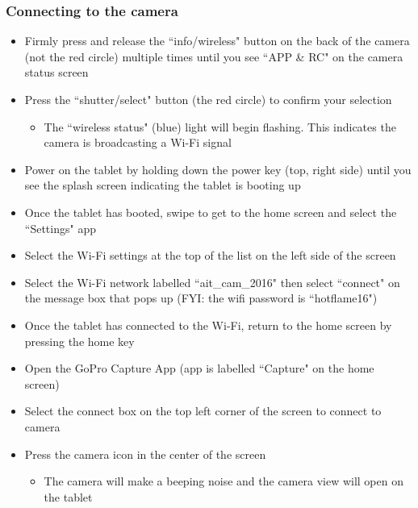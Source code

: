 \documentclass[letterpaper,11pt]{article}
\begin{document}
       
    \subsubsection{Connecting to the camera} 
        \begin{itemize}
        \item Firmly press and release the ``info/wireless" button on the back of
			the camera (not the red circle) multiple times until you see ``APP \& RC" on the camera status screen
        \item Press the ``shutter/select" button (the red circle) to confirm your selection
            \begin{itemize}
            \item The ``wireless status" (blue) light will begin flashing. This 
                indicates the camera is broadcasting a Wi-Fi signal 
            \end{itemize}
        \item Power on the tablet by holding down the power key (top, right side) until you see the
            splash screen indicating the tablet is booting up
        \item Once the tablet has booted, swipe to get to the home screen and 
            select the ``Settings" app
        \item Select the Wi-Fi settings at the top of the list on the left side 
            of the screen
        \item Select the Wi-Fi network labelled ``ait\_cam\_2016" then select 
            ``connect" on the message box that pops up (FYI: the wifi password is
            ``hotflame16")
        \item Once the tablet has connected to the Wi-Fi, return to the home 
            screen by pressing the home key
        \item Open the GoPro Capture App (app is labelled ``Capture" on the home 
            screen) 
        \item Select the connect box on the top left corner of the screen to connect to camera
        \item Press the camera icon in the center of the screen
            \begin{itemize}
            \item The camera will make a beeping noise and the camera view will 
                open on the tablet
            \end{itemize}
        \end{itemize}
    
\end{document}
